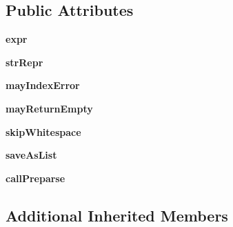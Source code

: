 \subsection*{Public Attributes}
\begin{DoxyCompactItemize}
\item 
\mbox{\label{classsetuptools_1_1__vendor_1_1pyparsing_1_1_parse_element_enhance_a445450bd765a74cc1d1567e40cade40d}} 
{\bfseries expr}
\item 
\mbox{\label{classsetuptools_1_1__vendor_1_1pyparsing_1_1_parse_element_enhance_a431f023ff77da06e428cde8a0fd5da1f}} 
{\bfseries str\+Repr}
\item 
\mbox{\label{classsetuptools_1_1__vendor_1_1pyparsing_1_1_parse_element_enhance_a5ef1f0636e3e7a3f96a69e75c910c3c9}} 
{\bfseries may\+Index\+Error}
\item 
\mbox{\label{classsetuptools_1_1__vendor_1_1pyparsing_1_1_parse_element_enhance_a72c1634dc350a267b784bfe0e3d2c360}} 
{\bfseries may\+Return\+Empty}
\item 
\mbox{\label{classsetuptools_1_1__vendor_1_1pyparsing_1_1_parse_element_enhance_a14565d0df531919a66c93eac7ee56fdb}} 
{\bfseries skip\+Whitespace}
\item 
\mbox{\label{classsetuptools_1_1__vendor_1_1pyparsing_1_1_parse_element_enhance_a4660708517eedc2f6f0e90710f38e8fd}} 
{\bfseries save\+As\+List}
\item 
\mbox{\label{classsetuptools_1_1__vendor_1_1pyparsing_1_1_parse_element_enhance_a2ede6069cc5569cac3c97c7161d196cc}} 
{\bfseries call\+Preparse}
\end{DoxyCompactItemize}
\subsection*{Additional Inherited Members}


